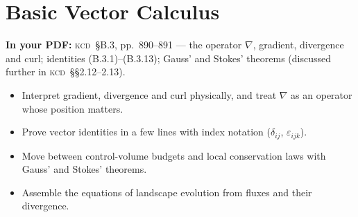 \documentclass[11pt,letterpaper]{article}
\numberwithin{equation}{section}
\newcommand{\Kundu}{\textnormal{\textsc{kcd}}}   %
\begin{document}
\clearpage
\section{Basic Vector Calculus}\label{sec:B3}
\begin{source}
\textbf{In your PDF:} \Kundu\ \S B.3, pp.~890--891 --- the operator $\nabla$, gradient, divergence and curl; identities
(B.3.1)--(B.3.13); Gauss' and Stokes' theorems (discussed further in \Kundu\ \S\S2.12--2.13).
\end{source}

\begin{goals}
\begin{itemize}
  \item Interpret gradient, divergence and curl physically, and treat $\nabla$ as an operator whose position matters.
  \item Prove vector identities in a few lines with index notation ($\delta_{ij}$, $\varepsilon_{ijk}$).
  \item Move between control-volume budgets and local conservation laws with Gauss' and Stokes' theorems.
  \item Assemble the equations of landscape evolution from fluxes and their divergence.
\end{itemize}
\end{goals}
\end{document}

